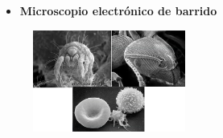\documentclass[a4paper]{article}
\begin{document}
    \begin{itemize}
        \item \textbf{Microscopio electrónico de barrido}
    \end{itemize}

    \begin{figure}[h!]
        \centering
        \includegraphics[width = 5cm]{../barrido.png}
    \end{figure}
\end{document}
